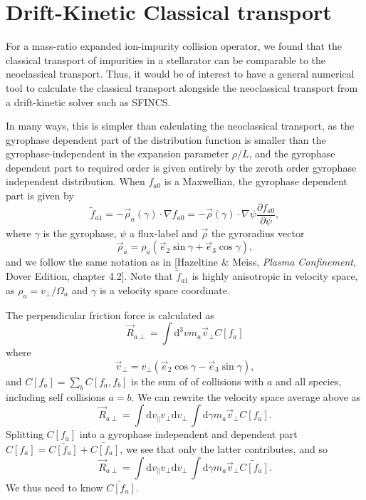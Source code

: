 \documentclass[12pt, a4paper]{article}
\newcommand{\p}{\ensuremath{\partial}}
\renewcommand{\d}{\ensuremath{\mathrm{d}}}
\begin{document}
\section{Drift-Kinetic Classical transport}
For a mass-ratio expanded ion-impurity collision operator, we found that the classical transport of impurities in a stellarator can be comparable to the neoclassical transport. Thus, it would be of interest to have a general numerical tool to calculate the classical transport alongside the neoclassical transport from a drift-kinetic solver such as SFINCS.

In many ways, this is simpler than calculating the neoclassical transport, as the gyrophase dependent part of the distribution function is smaller than the gyrophase-independent in the expansion parameter $\rho/L$, and the gyrophase dependent part to required order is given entirely by the zeroth order gyrophase independent distribution. When $f_{a0}$ is a Maxwellian, the gyrophase dependent part is given by
\begin{equation}
\tilde{f}_{a1} = -\vec{\rho}_a(\gamma) \cdot \nabla f_{a0} = -\vec{\rho}(\gamma) \cdot \nabla \psi  \frac{\p f_{a0}}{\p \psi}, \label{eq:tildeF}
\end{equation}
where $\gamma$ is the gyrophase, $\psi$ a flux-label and $\vec{\rho}$ the gyroradius vector
\begin{equation}
\vec{\rho}_a = \rho_a (\vec{e}_2 \sin \gamma + \vec{e}_3 \cos\gamma),
\end{equation}
and we follow the same notation as in [Hazeltine \& Meiss, \emph{Plasma Confinement}, Dover Edition, chapter 4.2]. Note that $\tilde{f}_{a1}$ is highly anisotropic in velocity space, as $\rho_a = v_\perp/\Omega_a$ and $\gamma$ is a velocity space coordinate. 

The perpendicular friction force is calculated as
\begin{equation}
  \vec{R}_{a\perp} = \int \d^3 v m_a \vec{v}_\perp C[f_a]
\end{equation}
where
\begin{equation}
  \vec{v}_\perp = v_\perp \left(\vec{e}_2 \cos\gamma - \vec{e}_3 \sin \gamma\right),
\end{equation}
and $C[f_a] = \sum_b C[f_a,f_b]$ is the sum of of collisions with $a$ and all species, including self collisions $a=b$. We can rewrite the velocity space average above as
\begin{equation}
  \vec{R}_{a\perp} = \int \d v_\| v_\perp \d v_\perp\, \int \d\gamma m_a \vec{v}_\perp C[f_a].
\end{equation}
Splitting $C[f_a]$ into a gyrophase independent and dependent part $C[f_a]  = \bar{C[f_a]} + \tilde{C[f_a]}$, we see that only the latter contributes, and so
\begin{equation}
  \vec{R}_{a\perp} = \int \d v_\| v_\perp \d v_\perp\, \int \d\gamma m_a \vec{v}_\perp \tilde{C[f_a]}.
\end{equation}
We thus need to know $\tilde{C[f_a]}$.
\end{document}
